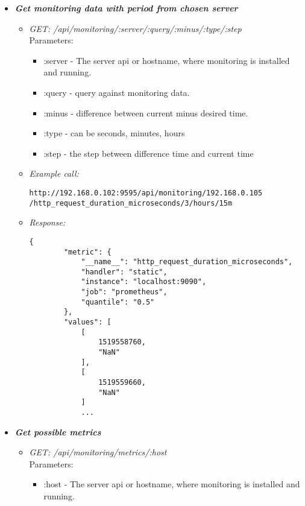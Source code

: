 \begin{itemize}
\item \textbf{\textit{Get monitoring data with period from chosen server}}
\begin{itemize}
\item \emph{GET: /api/monitoring/:server/:query/:minus/:type/:step}
\\Parameters:
\begin{itemize}
\item :server - The server api or hostname, where monitoring is installed and running.
\item :query - query against monitoring data.
\item :minus - difference between current minus desired time.
\item :type - can be seconds, minutes, hours 
\item :step - the step between difference time and current time
\end{itemize}

\item \emph{Example call:}
 \begin{lstlisting}
http://192.168.0.102:9595/api/monitoring/192.168.0.105
/http_request_duration_microseconds/3/hours/15m
\end{lstlisting}

\item \emph{Response:}
 \begin{lstlisting}
{
        "metric": {
            "__name__": "http_request_duration_microseconds",
            "handler": "static",
            "instance": "localhost:9090",
            "job": "prometheus",
            "quantile": "0.5"
        },
        "values": [
            [
                1519558760,
                "NaN"
            ],
            [
                1519559660,
                "NaN"
            ]
            ...
\end{lstlisting}
\end{itemize}


\item \textbf{\textit{Get possible metrics}}
\begin{itemize}
\item \emph{GET: /api/monitoring/metrics/:host}
\\Parameters:
\begin{itemize}
\item :host - The server api or hostname, where monitoring is installed and running.
\end{itemize}


\end{itemize}
\end{itemize}
